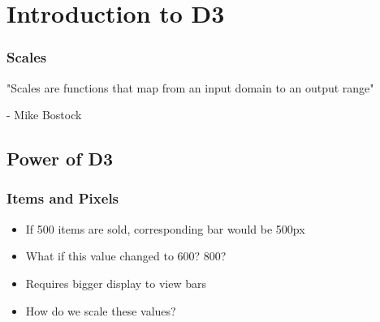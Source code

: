 \documentclass[red]{beamer}
\begin{document}

\begin{frame}
  \titlepage
\end{frame}

\section[Outline]{}

\section{Introduction to D3}

\begin{frame}
    \frametitle{Scales}
    "Scales are functions that map from an input domain to an output range"

    \hspace{0.9cm} - Mike Bostock 
\end{frame}


\subsection{Power of D3}

\begin{frame}
  \frametitle{Items and Pixels}   %
  \lstl

  \begin{itemize}
  \item<1-> If 500 items are sold, corresponding bar would be 500px
  \item<2-> What if this value changed to 600? 800?
  \item<3-> Requires bigger display to view bars
  \item<4-> How do we scale these values?
  \end{itemize}
\end{frame}
\end{document}
